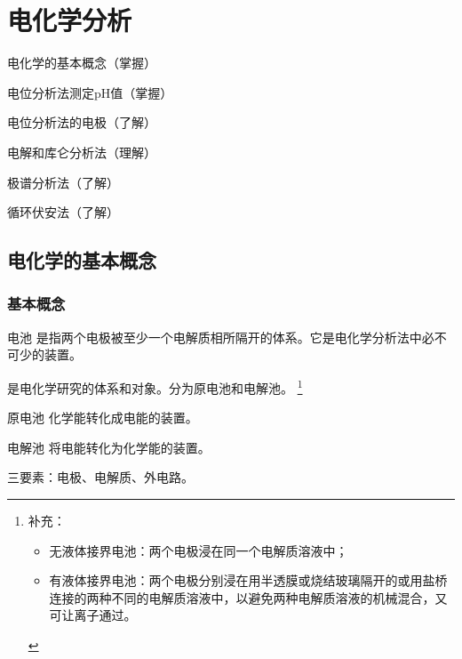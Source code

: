 \chapter{电化学分析}

\begin{introduction}
	\item 电化学的基本概念（掌握）
	\item 电位分析法测定pH值（掌握）
	\item 电位分析法的电极（了解）
	\item 电解和库仑分析法（理解）
	\item 极谱分析法（了解）
	\item 循环伏安法（了解）
\end{introduction}



\section{电化学的基本概念}

\subsection{基本概念}
\begin{definition*}{电池}{}
	是指两个电极被至少一个电解质相所隔开的体系。它是电化学分析法中必不可少的装置。
\end{definition*}

是电化学研究的体系和对象。分为原电池和电解池。
\footnote{补充：\begin{itemize}
		\item 无液体接界电池：两个电极浸在同一个电解质溶液中；
		\item 有液体接界电池：两个电极分别浸在用半透膜或烧结玻璃隔开的或用盐桥连接的两种不同的电解质溶液中，以避免两种电解质溶液的机械混合，又可让离子通过。
\end{itemize}}

\begin{definition*}{原电池}{}
	化学能转化成电能的装置。
\end{definition*}

\begin{definition*}{电解池}{}
	将电能转化为化学能的装置。
\end{definition*}
	
三要素：电极、电解质、外电路。

